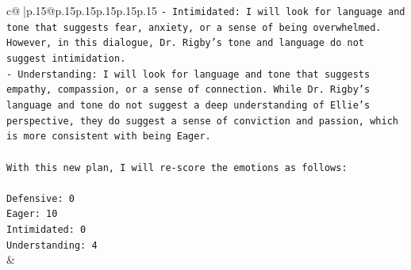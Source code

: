 \documentclass{article}
\begin{document}
{\begin{supertabular}{c@{$\;$}|p{.15\linewidth}@{}p{.15\linewidth}p{.15\linewidth}p{.15\linewidth}p{.15\linewidth}p{.15\linewidth}}
{{{\texttt{{-} Intimidated: I will look for language and tone that suggests fear, anxiety, or a sense of being overwhelmed. However, in this dialogue, Dr. Rigby's tone and language do not suggest intimidation.} \\
\texttt{{-} Understanding: I will look for language and tone that suggests empathy, compassion, or a sense of connection. While Dr. Rigby's language and tone do not suggest a deep understanding of Ellie's perspective, they do suggest a sense of conviction and passion, which is more consistent with being Eager.} \\
\\ 
\texttt{With this new plan, I will re{-}score the emotions as follows:} \\
\\ 
\texttt{Defensive: 0} \\
\texttt{Eager: 10} \\
\texttt{Intimidated: 0} \\
\texttt{Understanding: 4} \\
            }
        }
    }
    & \\ \\

\end{supertabular}
}
\end{document}
